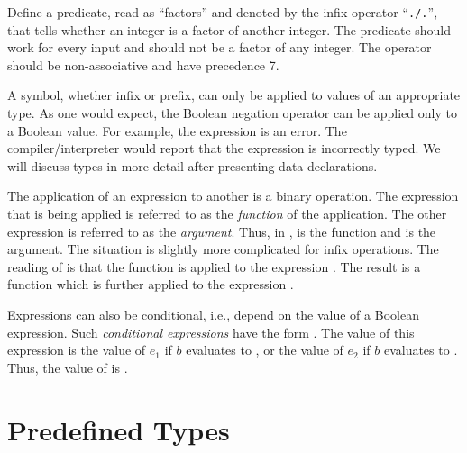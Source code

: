 \begin{exercise}
\label{ex_factor}
Define a predicate, read as ``factors'' and denoted by
the infix operator ``\verb|./.|'', that tells whether an
integer is a factor of another integer.
The predicate should work for every input and 
should not be a factor of any integer.
The operator should be non-associative and have precedence 7.
\end{exercise}

A symbol, whether infix or prefix, can only be applied to
values of an appropriate type.
As one would expect, the Boolean negation operator can be
applied only to a Boolean value.
For example, the expression  is an error.
The compiler/interpreter would
report that the expression is incorrectly typed.
We will discuss types in more detail after presenting
data declarations.

The application of an expression to another is a binary operation.
The expression that is being applied is referred to as the
\emph{function} of the application.
The other expression is referred to as the \emph{argument}.
Thus, in ,  is the function
and  is the argument.
The situation is slightly more complicated for infix operations.
The reading of  is that the function \ccode{+}
is applied to the expression .
The result is a function which is further applied to the expression
.

Expressions can also be conditional, i.e., depend
on the value of a Boolean expression.
Such \emph{conditional expressions}%
%
have the form .
The value of this expression is the value of $e_1$ if $b$ evaluates
to , or the value of $e_2$ if $b$ evaluates to .
Thus, the value of  is .


\section{Predefined Types}
\label{Predefined Types}

